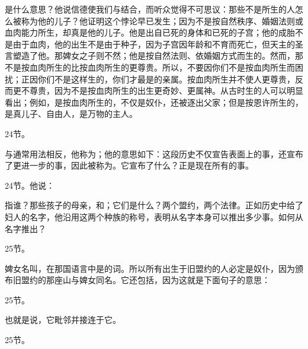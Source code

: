 是什么意思？他说信德使我们与结合，而听众觉得不可思议：那些不是所生的人怎么被称为他的儿子？他证明这个悖论早已发生；因为不是按自然秩序、婚姻法则或血肉能力所生，却真是他的儿子。他是出自已死的身体和已死的子宫；他的成胎不是由于血肉，他的出生不是由于种子，因为子宫因年龄和不育而死亡，但天主的圣言塑造了他。那婢女之子则不然；他是按自然法则、依婚姻方式而生的。然而，那不是按血肉所生的比按血肉所生的更尊贵。所以，不要因你们不是按血肉所生而困扰；正因你们不是这样生的，你们才最是的亲属。按血肉所生并不使人更尊贵，反而更不尊贵，因为不是按血肉所生的出生更奇妙、更属神。从古时生的人可以明显看出；例如，是按血肉所生的，不仅是奴仆，还被逐出父家；但是按恩许所生的，是真儿子、自由人，是万物的主人。\par

24节。\par

与通常用法相反，他称为；他的意思如下：这段历史不仅宣告表面上的事，还宣布了更进一步的事，因此被称为。它宣布了什么？正是现在所有的事。\par

24节。他说：\par

指谁？那些孩子的母亲，和；它们是什么？两个盟约，两个法律。正如历史中给了妇人的名字，他沿用这两个种族的称号，表明从名字本身可以推出多少事。如何从名字推出？\par

25节。\par

婢女名叫，在那国语言中是的词。所以所有出生于旧盟约的人必定是奴仆，因为颁布旧盟约的那座山与婢女同名。它还包括，因为这就是下面句子的意思：\par

25节。\par

也就是说，它毗邻并接连于它。\par

25节。\par

